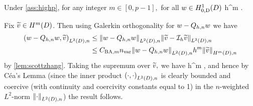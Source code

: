 





\label{lem:wltdprojerr}
Under \cref{ass:highp}, for any integer $m \in [0,p-1],$ for all $w \in \HozDD$
\beq\label{eq:wltdprojerr}
 \leq {} \nvar h^{m} .
\eeq
\ele

Fix $\vtilde \in \HmD$. Then using Galerkin orthogonality for $w - Q_{h,n} w$ we have
\begin{align*}
  \IPLtDn{w-\Qhn w}{\vtilde} &\leq \NLtDn{w-\Qhn w}\NLtDn{\vtilde-\Ih\vtilde}\\
  &\leq \CSZfn{m} \nvar\NLtDn{w-\Qhn w} h^m \NHmDn{\vtilde}
\end{align*}
by \cref{lem:scottzhang}. Taking the supremum over $\widetilde{v},$ we have
\beqs
{} \leq {} \nvar h^m ,
\eeqs
and hence by C\'ea's Lemma (since the inner product $\IPLtDn{\cdot}{\cdot}$ is clearly bounded and coercive (with continuity and coercivity constants equal to 1) in the $n$-weighted $L^2$-norm $\NLtDn{\cdot}$) the result follows.
\epf

